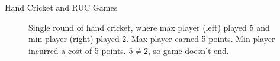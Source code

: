 \documentclass[final,20pt]{beamer}
\newlength{\colwidth}
\begin{document}
\begin{frame}[t]
\begin{columns}[t]
\begin{column}{\colwidth}
\begin{block}{Hand Cricket and RUC Games}
\begin{figure}[htb]
\centering
{}%
\hfill
{}%
\caption{Single round of hand cricket, where max player (left) played 5 and min player (right) played 2.
Max player earned 5 points. Min player incurred a cost of 5 points.
$5 \neq 2$, so game doesn't end.}
\end{figure}


\end{block}
\end{column}
\end{columns}
\end{frame}
\end{document}
